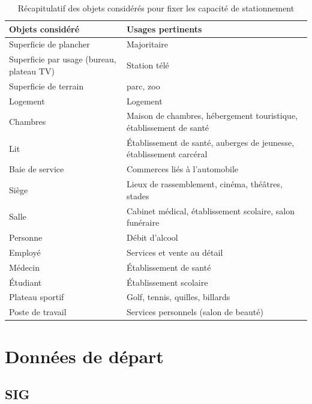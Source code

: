   \begin{table}[h]
    \centering
    \begin{tabular}{p{4cm} p{8cm}}
      \hline
      Objets considéré & Usages pertinents \\
      \hline
      Superficie de plancher & Majoritaire\\
      Superficie par usage (bureau, plateau TV) & Station télé \\
      Superficie de terrain & parc, zoo \\
      Logement & Logement \\
      Chambres & Maison de chambres, hébergement touristique, établissement de santé\\
      Lit & Établissement de santé, auberges de jeunesse, établissement carcéral \\
      Baie de service & Commerces liés à l'automobile\\
      Siège & Lieux de rassemblement, cinéma, théâtres, stades \\
      Salle & Cabinet médical, établissement scolaire, salon funéraire\\
      Personne & Débit d'alcool\\
      Employé & Services et vente au détail\\
      Médecin & Établissement de santé\\
      Étudiant & Établissement scolaire\\
      Plateau sportif & Golf, tennis, quilles, billards\\
      Poste de travail & Services personnels (salon de beauté)\\
      \hline
    \end{tabular}
    \caption{Récapitulatif des objets considérés pour fixer les capacité de stationnement}\label{tab:objet_pour_inference_capacite}
  \end{table}
  

  \FloatBarrier

\section{Données de départ}\label{sec:meth_donnees_dispo}
  \subsection{\ac{SIG}}
